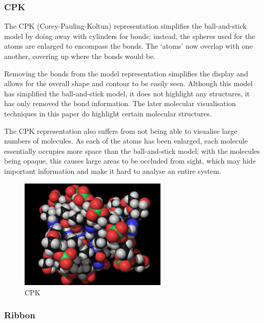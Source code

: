 
\subsubsection*{CPK}
\label{ssub:cpk}

The CPK (Corey-Pauling-Koltun) \citep{corey53} representation simplifies the
ball-and-stick model by doing away with cylinders for bonds; instead, the
spheres used for the atoms are enlarged to encompass the bonds. The `atoms' now
overlap with one another, covering up where the bonds would be.

Removing the bonds from the model representation simplifies the display and
allows for the overall shape and contour to be easily seen. Although this model
has simplified the ball-and-stick model, it does not highlight any structures,
it has only removed the bond information. The later molecular visualisation
techniques in this paper do highlight certain molecular structures.

The CPK representation also suffers from not being able to visualise large
numbers of molecules. As each of the atoms has been enlarged, each molecule
essentially occupies more space than the ball-and-stick model; with the
molecules being opaque, this causes large areas to be occluded from sight, which
may hide important information and make it hard to analyse an entire system.

\begin{figure}[h!]
  \begin{center}
    \includegraphics[width=70mm]{CPK-big}
  \end{center}
  \caption{CPK}
  \label{fig:cpkbig}
\end{figure}


\subsubsection*{Ribbon}
\label{ssub:ribbon}

